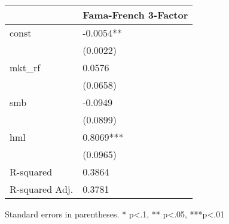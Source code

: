 \begin{table}
\caption{}
\label{}
\begin{center}
\begin{tabular}{ll}
\hline
               & Fama-French 3-Factor  \\
\hline
const          & -0.0054**             \\
               & (0.0022)              \\
mkt\_rf        & 0.0576                \\
               & (0.0658)              \\
smb            & -0.0949               \\
               & (0.0899)              \\
hml            & 0.8069***             \\
               & (0.0965)              \\
R-squared      & 0.3864                \\
R-squared Adj. & 0.3781                \\
\hline
\end{tabular}
\end{center}
\end{table}
\bigskip
Standard errors in parentheses. \newline 
* p<.1, ** p<.05, ***p<.01